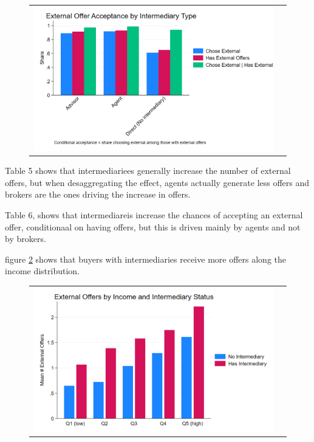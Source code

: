 \documentclass[12pt]{article}
\begin{document}
\begin{figure}[H]
\caption{}
 \label{fig:ie4_10}
\centering{}%
\begin{tabular}{cc}
\includegraphics[scale=0.17]{figures/IE4/IE4_external_acceptance_by_intermediary.png} 
\end{tabular}
\end{figure} 
 
Table 5 shows that intermediariees generally increase the number of external offers, but when desaggregating the effect, agents actually generate less offers and brokers are the ones driving the increase in offers. 
 

 Table 6, shows that intermediareis increase the chances of accepting an external offer,  conditionaal on having offers, but this is driven mainly by agents and not by brokers.

  
figure \ref{fig:ie4_11} shows that buyers with intermediaries receive more offers along the income distribution. 
  \begin{figure}[H]
\caption{}
 \label{fig:ie4_11}
\centering{}%
\begin{tabular}{cc}
\includegraphics[scale=0.27]{figures/IE4/IE4_external_by_income_intermediary.png} 
\end{tabular}
\end{figure} 
\end{document}
